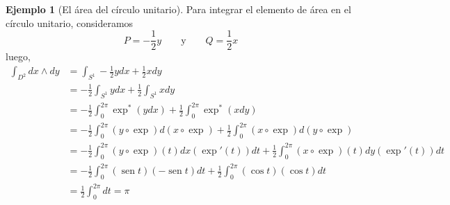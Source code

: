 \documentclass[spanish]{article}
\theoremstyle{definition}
\newtheorem*{ejem}{Ejemplo}
\DeclareMathOperator{\sen}{sen}
\begin{document}
	\begin{ejem}[El área del círculo unitario]
		Para integrar el elemento de área en el círculo unitario, consideramos
		\[P=-\frac{1}{2}y\qquad\text{y}\qquad Q=\frac{1}{2}x\]
		luego,
		\begin{align*}
			\int_{D^2}dx\wedge dy&=\int_{S^1}-\frac{1}{2}ydx+\frac{1}{2}xdy\\
			&=-\frac{1}{2}\int_{S^1}ydx+\frac{1}{2}\int_{S^1}xdy\\
			&=-\frac{1}{2}\int_0^{2\pi}\exp^*(ydx)+\frac{1}{2}\int_0^{2\pi}\exp^*(xdy)\\
			&=-\frac{1}{2}\int_0^{2\pi}(y\circ \exp)d(x\circ \exp)+\frac{1}{2}\int_0^{2\pi}(x\circ \exp)d(y\circ \exp)\\
			&=-\frac{1}{2}\int_0^{2\pi}(y\circ \exp)(t)dx(\exp'(t))dt+\frac{1}{2}\int_0^{2\pi}(x\circ \exp)(t)dy(\exp'(t))dt\\
			&=-\frac{1}{2}\int_0^{2\pi}(\sen t)(-\sen t) dt+\frac{1}{2}\int_0^{2\pi}(\cos t)(\cos t)dt\\
			&=\frac{1}{2}\int_0^{2\pi}dt=\pi
		\end{align*}
	\end{ejem}
	
	
\end{document}
